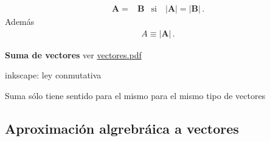 \begin{align}
  \mathbf{A}=&\mathbf{B} & \text{si}\quad |\mathbf{A}|=
  |\mathbf{B}|\,.
\end{align}
Adem\'as
\begin{align}
  A\equiv|\mathbf{A}|\,.
\end{align}

\textbf{Suma de vectores}
ver \href{https://docs.google.com/viewer?a=v&pid=sites&srcid=ZmlzaWNhLnVkZWEuZWR1LmNvfG1lY2FuaWNhfGd4OjdmNWMyZTc5NDIxNTAxNjg}{vectores.pdf}
\begin{inprogress}
  inkscape: ley conmutativa
\end{inprogress}
Suma s\'olo tiene sentido para el mismo para el mismo tipo de vectores


\subsection{Aproximaci\'on algrebr\'aica  a vectores}

